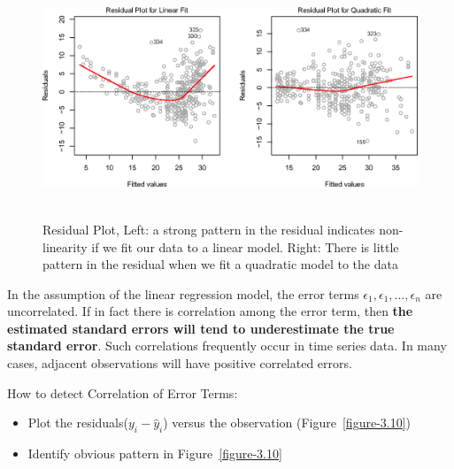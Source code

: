 \documentclass[12pt,a4paper]{article}%
\theoremstyle{definition}
\theoremstyle{plain}
\numberwithin{equation}{section}
\newcounter{subsubsubsection}[subsubsection]
\begin{document}
\begin{figure}[H]
\centering
\includegraphics[scale=0.85]{images//3_9.eps}
\\~\\
\caption{Residual Plot, Left: a strong pattern in the residual indicates non-linearity if we fit our data to a linear model. Right: There is little pattern in the residual when we fit a quadratic model to the data}\label{figure-3.9}
\end{figure}

\subsubsubsection{\color{blue}{Correlation of Error Terms}}
In the assumption of the linear regression model, the error terms $\epsilon_{1}, \epsilon_{1}, \dots, \epsilon_{n}$ are uncorrelated. 
If in fact there is correlation among the error term, then \textbf{the estimated standard errors will tend to underestimate the true standard error}.
Such correlations frequently occur in time series data. In many cases, adjacent observations will have positive correlated errors.

How to detect Correlation of Error Terms:
\begin{itemize}
\item Plot the residuals($y_{i}-\hat{y}_{i}$) versus the observation (Figure~\ref{figure-3.10})
\item Identify obvious pattern in Figure~\ref{figure-3.10}
\end{itemize}
\end{document}
